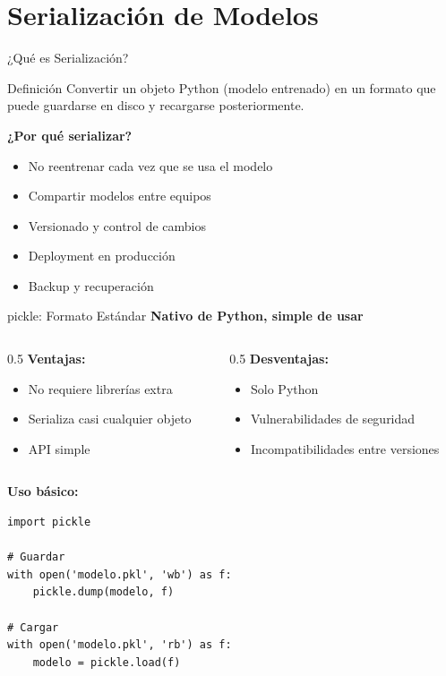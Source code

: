 \documentclass[aspectratio=169]{beamer}
\begin{document}
\section{Serialización de Modelos}

\begin{frame}{¿Qué es Serialización?}
\begin{block}{Definición}
Convertir un objeto Python (modelo entrenado) en un formato que puede guardarse en disco y recargarse posteriormente.
\end{block}

\vspace{0.3cm}

\textbf{¿Por qué serializar?}
\begin{itemize}
\item No reentrenar cada vez que se usa el modelo
\item Compartir modelos entre equipos
\item Versionado y control de cambios
\item Deployment en producción
\item Backup y recuperación
\end{itemize}
\end{frame}

\begin{frame}[fragile]{pickle: Formato Estándar}
\textbf{Nativo de Python, simple de usar}

\vspace{0.2cm}

\begin{columns}
\begin{column}{0.5\textwidth}
\textbf{Ventajas:}
\begin{itemize}
\item No requiere librerías extra
\item Serializa casi cualquier objeto
\item API simple
\end{itemize}
\end{column}

\begin{column}{0.5\textwidth}
\textbf{Desventajas:}
\begin{itemize}
\item Solo Python
\item Vulnerabilidades de seguridad
\item Incompatibilidades entre versiones
\end{itemize}
\end{column}
\end{columns}

\vspace{0.3cm}

\textbf{Uso básico:}
\begin{verbatim}
import pickle

# Guardar
with open('modelo.pkl', 'wb') as f:
    pickle.dump(modelo, f)

# Cargar
with open('modelo.pkl', 'rb') as f:
    modelo = pickle.load(f)
\end{verbatim}
\end{frame}
\end{document}
